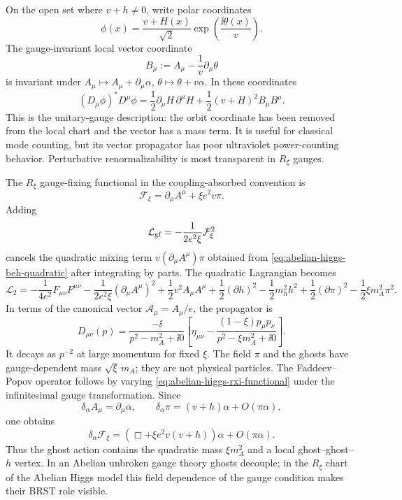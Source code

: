 On the open set where \(v+h\neq0\), write polar coordinates
\[
  \phi(x)=\frac{v+H(x)}{\sqrt2}\exp\!\left(\frac{\ii\theta(x)}{v}\right).
\]
The gauge-invariant local vector coordinate
\begin{equation}
  B_\mu
  :=
  A_\mu-\frac1v\partial_\mu\theta
  \label{eq:abelian-higgs-gauge-invariant-vector}
\end{equation}
is invariant under \(A_\mu\mapsto A_\mu+\partial_\mu\alpha\),
\(\theta\mapsto\theta+v\alpha\).  In these coordinates
\[
  (D_\mu\phi)^*D^\mu\phi
  =
  \frac12\partial_\mu H\,\partial^\mu H
  +
  \frac12(v+H)^2B_\mu B^\mu .
\]
This is the unitary-gauge description: the orbit coordinate has been removed
from the local chart and the vector has a mass term.  It is useful for
classical mode counting, but its vector propagator has poor ultraviolet
power-counting behavior.  Perturbative renormalizability is most transparent
in \(R_\xi\) gauges.

The \(R_\xi\) gauge-fixing functional in the coupling-absorbed convention is
\begin{equation}
  \mathcal F_\xi
  =
  \partial_\mu A^\mu+\xi e^2v\pi .
  \label{eq:abelian-higgs-rxi-functional}
\end{equation}
Adding
\[
  \mathcal L_{\rm gf}
  =
  -\frac1{2e^2\xi}\mathcal F_\xi^2
\]
cancels the quadratic mixing term \(v(\partial_\mu A^\mu)\pi\) obtained from
\eqref{eq:abelian-higgs-beh-quadratic} after integrating by parts.  The
quadratic Lagrangian becomes
\[
  \mathcal L_2
  =
  -\frac1{4e^2}F_{\mu\nu}F^{\mu\nu}
  -\frac1{2e^2\xi}(\partial_\mu A^\mu)^2
  +\frac12v^2A_\mu A^\mu
  +\frac12(\partial h)^2-\frac12m_h^2h^2
  +\frac12(\partial\pi)^2-\frac12\xi m_A^2\pi^2 .
\]
In terms of the canonical vector \(\mathcal A_\mu=A_\mu/e\), the propagator is
\begin{equation}
  D_{\mu\nu}(p)
  =
  \frac{-\ii}{p^2-m_A^2+\ii0}
  \left[
    \eta_{\mu\nu}
    -
    \frac{(1-\xi)p_\mu p_\nu}
         {p^2-\xi m_A^2+\ii0}
  \right].
  \label{eq:abelian-higgs-rxi-vector-propagator}
\end{equation}
It decays as \(p^{-2}\) at large momentum for fixed \(\xi\).  The field
\(\pi\) and the ghosts have gauge-dependent mass \(\sqrt{\xi}\,m_A\); they are
not physical particles.  The Faddeev--Popov operator follows by varying
\eqref{eq:abelian-higgs-rxi-functional} under the infinitesimal gauge
transformation.  Since
\[
  \delta_\alpha A_\mu=\partial_\mu\alpha,
  \qquad
  \delta_\alpha\pi=(v+h)\alpha+O(\pi\alpha),
\]
one obtains
\[
  \delta_\alpha\mathcal F_\xi
  =
  \left(\Box+\xi e^2v(v+h)\right)\alpha+O(\pi\alpha).
\]
Thus the ghost action contains the quadratic mass \(\xi m_A^2\) and a local
ghost--ghost--\(h\) vertex.  In an Abelian unbroken gauge theory ghosts
decouple; in the \(R_\xi\) chart of the Abelian Higgs model this field
dependence of the gauge condition makes their BRST role visible.


